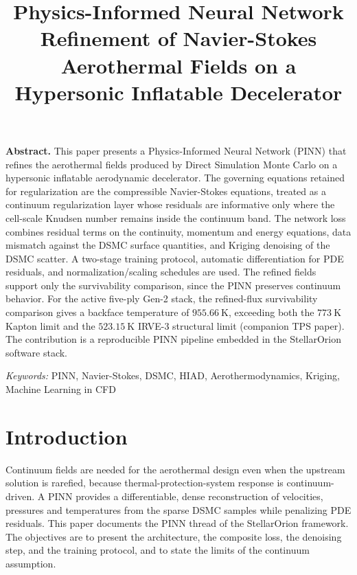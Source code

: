 \documentclass[conference]{IEEEtran}
\begin{document}
\title{Physics-Informed Neural Network Refinement of Navier-Stokes Aerothermal Fields on a Hypersonic Inflatable Decelerator}

\author{
}

\maketitle

\noindent\textbf{Abstract.}\quad
This paper presents a Physics-Informed Neural Network (PINN) that refines the aerothermal fields produced by Direct Simulation Monte Carlo on a hypersonic inflatable aerodynamic decelerator. The governing equations retained for regularization are the compressible Navier-Stokes equations, treated as a continuum regularization layer whose residuals are informative only where the cell-scale Knudsen number remains inside the continuum band. The network loss combines residual terms on the continuity, momentum and energy equations, data mismatch against the DSMC surface quantities, and Kriging denoising of the DSMC scatter. A two-stage training protocol, automatic differentiation for PDE residuals, and normalization/scaling schedules are used. The refined fields support only the survivability comparison, since the PINN preserves continuum behavior. For the active five-ply Gen-2 stack, the refined-flux survivability comparison gives a backface temperature of $955.66~\mathrm{K}$, exceeding both the $773~\mathrm{K}$ Kapton limit and the $523.15~\mathrm{K}$ IRVE-3 structural limit (companion TPS paper). The contribution is a reproducible PINN pipeline embedded in the StellarOrion software stack.
\par\vspace{0.5em}

\noindent\textit{Keywords:}\quad
PINN, Navier-Stokes, DSMC, HIAD, Aerothermodynamics, Kriging, Machine Learning in CFD
\par\vspace{1em}

\section{Introduction}
Continuum fields are needed for the aerothermal design even when the upstream solution is rarefied, because thermal-protection-system response is continuum-driven. A PINN provides a differentiable, dense reconstruction of velocities, pressures and temperatures from the sparse DSMC samples while penalizing PDE residuals. This paper documents the PINN thread of the StellarOrion framework. The objectives are to present the architecture, the composite loss, the denoising step, and the training protocol, and to state the limits of the continuum assumption.
\end{document}
